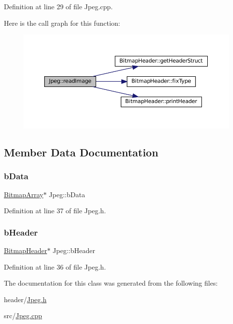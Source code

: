 Definition at line 29 of file Jpeg.\+cpp.

Here is the call graph for this function\+:
\nopagebreak
\begin{figure}[H]
\begin{center}
\leavevmode
\includegraphics[width=350pt]{classJpeg_a80db9e22efc544e32145b6743b2b407c_cgraph}
\end{center}
\end{figure}


\subsection{Member Data Documentation}
\mbox{\label{classJpeg_a3ea01fc26477aac0dbed3514e8f82874}} 
\subsubsection{\texorpdfstring{bData}{bData}}
{\footnotesize\ttfamily \mbox{\hyperlink{classBitmapArray}{Bitmap\+Array}}$\ast$ Jpeg\+::b\+Data\hspace{0.3cm}{\ttfamily [private]}}



Definition at line 37 of file Jpeg.\+h.

\mbox{\label{classJpeg_aa082665a8e0eedfbb78e0a828198c0a0}} 
\subsubsection{\texorpdfstring{bHeader}{bHeader}}
{\footnotesize\ttfamily \mbox{\hyperlink{classBitmapHeader}{Bitmap\+Header}}$\ast$ Jpeg\+::b\+Header\hspace{0.3cm}{\ttfamily [private]}}



Definition at line 36 of file Jpeg.\+h.



The documentation for this class was generated from the following files\+:\begin{DoxyCompactItemize}
\item 
header/\mbox{\hyperlink{Jpeg_8h}{Jpeg.\+h}}\item 
src/\mbox{\hyperlink{Jpeg_8cpp}{Jpeg.\+cpp}}\end{DoxyCompactItemize}
